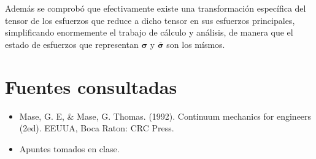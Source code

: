 \documentclass{article}
\begin{document}
    Adem\'{a}s se comprob\'{o} que efectivamente existe una transformaci\'{o}n espec\'{i}fica del tensor
    de los esfuerzos que reduce a dicho tensor en sus esfuerzos principales, simplificando enormemente
    el trabajo de c\'{a}lculo y an\'{a}lisis, de manera que el estado de esfuerzos que representan 
    $\bm{\sigma}$ y $\bm{\overline{\sigma}}$ son los m\'{i}smos.

    \section{Fuentes consultadas}
    \begin{itemize}
        \item Mase, G. E, \& Mase, G. Thomas. (1992). Continuum mechanics for engineers (2ed). EEUUA, Boca Raton: CRC Press.
        \item Apuntes tomados en clase.
    \end{itemize}

    
\end{document}
